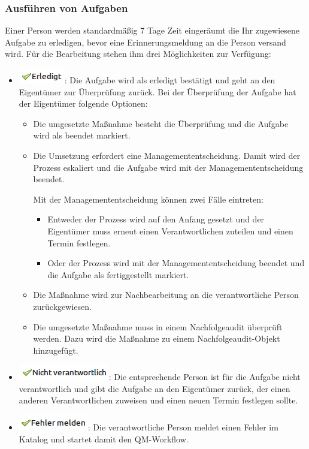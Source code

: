 \documentclass[a4paper,10pt]{book}
\begin{document}
\subsubsection{Ausführen von Aufgaben}
Einer Person werden standardmäßig 7 Tage Zeit eingeräumt die Ihr zugewiesene
Aufgabe zu erledigen, bevor eine Erinnerungsmeldung an die Person versand wird.
Für die Bearbeitung stehen ihm drei Möglichkeiten zur Verfügung:
\begin{itemize}
\item \includegraphics[height=3ex]{Icon/Erledigt.png}: Die Aufgabe wird als
erledigt bestätigt und geht an den Eigentümer zur Überprüfung zurück. Bei der
Überprüfung der Aufgabe hat der Eigentümer folgende Optionen:
  \begin{itemize}
   \item Die umgesetzte Maßnahme besteht die Überprüfung und die Aufgabe wird
   als beendet markiert.
   \item Die Umsetzung erfordert eine Managemententscheidung. Damit wird der
   Prozess eskaliert und die Aufgabe wird mit der Managemententscheidung
   beendet.

Mit der Managemententscheidung können zwei Fälle eintreten:
\begin{itemize}
 \item Entweder der Prozess wird auf den Anfang gesetzt und der Eigentümer muss
 erneut einen Verantwortlichen zuteilen und einen Termin festlegen.
 \item Oder der Prozess wird mit der Managemententscheidung beendet und die
 Aufgabe als fertiggestellt markiert.
\end{itemize}
   \item Die Maßnahme wird zur Nachbearbeitung an die verantwortliche Person
   zurückgewiesen.
   \item Die umgesetzte Maßnahme muss in einem Nachfolgeaudit überprüft werden.
   Dazu wird die Maßnahme zu einem Nachfolgeaudit-Objekt hinzugefügt.
  \end{itemize}

\item \includegraphics[height=3ex]{Icon/Nicht_verantwortlich.png}: Die entsprechende Person ist für die Aufgabe nicht verantwortlich und gibt die Aufgabe an den
Eigentümer zurück, der einen anderen Verantwortlichen zuweisen und einen neuen Termin festlegen sollte.
\item \includegraphics[height=3ex]{Icon/Fehler_melden.png}: Die verantwortliche Person meldet einen Fehler im Katalog und startet damit den QM-Workflow.
\end{itemize}
\end{document}
